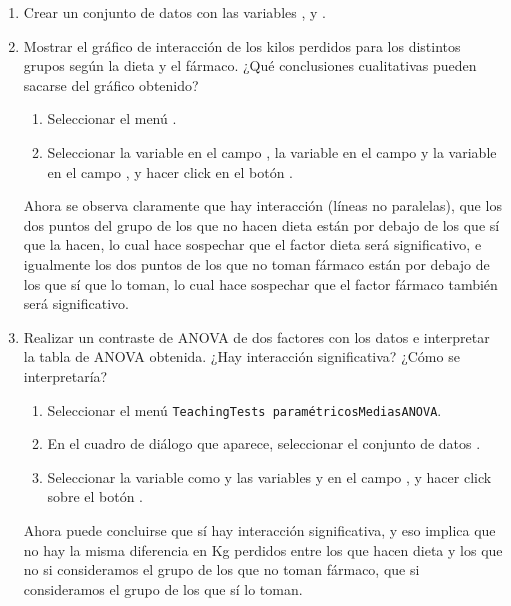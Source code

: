 \begin{enumerate}[leftmargin=*]
\begin{enumerate}
\item Crear un conjunto de datos  con las variables , 
y .

\item Mostrar el gráfico de interacción de los kilos perdidos para los distintos grupos según la dieta y el fármaco.
¿Qué conclusiones cualitativas pueden sacarse del gráfico obtenido? 
\begin{indicacion}{
\begin{enumerate}
\item Seleccionar el menú .
\item Seleccionar la variable  en el campo , la variable
 en el campo  y la variable  en el campo , y hacer click en el botón .
\end{enumerate}
Ahora se observa claramente que hay interacción (líneas no paralelas), que los dos puntos del grupo de los que no hacen
dieta están por debajo de los que sí que la hacen, lo cual hace sospechar que el factor dieta será significativo, e
igualmente los dos puntos de los que no toman fármaco están por debajo de los que sí que lo toman, lo cual hace
sospechar que el factor fármaco también será significativo.
}
\end{indicacion}  

\item Realizar un contraste de ANOVA de dos factores con los datos e interpretar la tabla de ANOVA obtenida. 
¿Hay interacción significativa?
¿Cómo se interpretaría? 
\begin{indicacion}{
\begin{enumerate}
\item Seleccionar el menú \texttt{Teaching\flecha Tests paramétricos\flecha Medias\flecha ANOVA}.
\item En el cuadro de diálogo que aparece, seleccionar el conjunto de datos .
\item Seleccionar la variable  como  y las variables
 y  en el campo , y hacer click sobre el botón
.
\end{enumerate}
Ahora puede concluirse que sí hay interacción significativa, y eso implica que no hay la misma diferencia en Kg perdidos
entre los que hacen dieta y los que no si consideramos el grupo de los que no toman fármaco, que si consideramos el
grupo de los que sí lo toman.
}
\end{indicacion}


\end{enumerate}
\end{enumerate}
